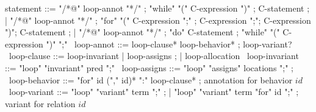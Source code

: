 \begin{syntax}
  statement ::= "/*@" loop-annot "*/" ;
  "while" "(" C-expression ")" ;
  C-statement ;
  | "/*@" loop-annot "*/" ;
  "for" "(" C-expression ";" ;
  C-expression ";";
  C-expression ")";
  C-statement ;
  | "/*@" loop-annot "*/" ;
  "do" C-statement ;
  "while" "(" C-expression ")" ";"
  \
  loop-annot ::= loop-clause* loop-behavior* ;
                 loop-variant?
  \
  loop-clause ::= loop-invariant | loop-assigns ;
                | loop-allocation
  \
  loop-invariant ::= "loop" "invariant" pred ";" 
  \
  loop-assigns ::= "loop" 
                   "assigns" locations ";" ;
  \
  loop-behavior ::= "for" id ("," id)* ":" loop-clause* ; annotation for behavior $id$
  \
  loop-variant ::= "loop" "variant" term ";" ;
  | "loop" "variant" term "for" id ";" ; variant for relation $id$
\end{syntax}

